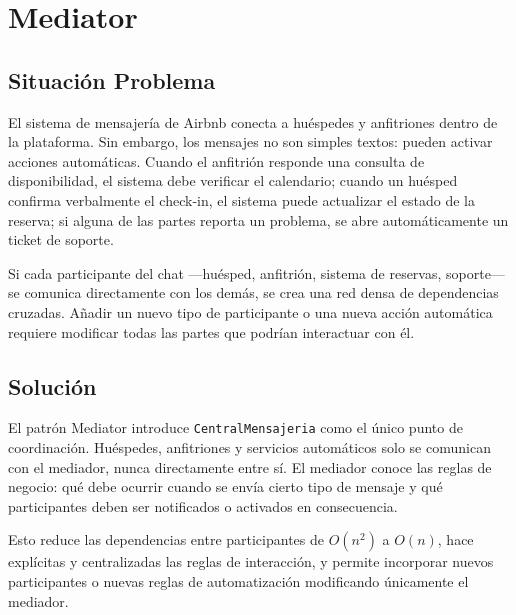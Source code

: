 
\chapter{Mediator}

\section{Situación Problema}

El sistema de mensajería de Airbnb conecta a huéspedes y anfitriones
dentro de la plataforma. Sin embargo, los mensajes no son simples textos:
pueden activar acciones automáticas. Cuando el anfitrión responde una
consulta de disponibilidad, el sistema debe verificar el calendario;
cuando un huésped confirma verbalmente el check-in, el sistema puede
actualizar el estado de la reserva; si alguna de las partes reporta
un problema, se abre automáticamente un ticket de soporte.

Si cada participante del chat —huésped, anfitrión, sistema de reservas,
soporte— se comunica directamente con los demás, se crea una red densa
de dependencias cruzadas. Añadir un nuevo tipo de participante
o una nueva acción automática requiere modificar todas las partes que
podrían interactuar con él.

\section{Solución}

El patrón Mediator introduce \texttt{CentralMensajeria} como el único
punto de coordinación. Huéspedes, anfitriones y servicios automáticos
solo se comunican con el mediador, nunca directamente entre sí. El
mediador conoce las reglas de negocio: qué debe ocurrir cuando se
envía cierto tipo de mensaje y qué participantes deben ser notificados
o activados en consecuencia.

Esto reduce las dependencias entre participantes de $O(n^2)$ a $O(n)$,
hace explícitas y centralizadas las reglas de interacción, y permite
incorporar nuevos participantes o nuevas reglas de automatización
modificando únicamente el mediador.

